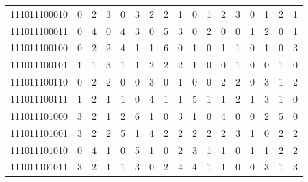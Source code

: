 \documentclass[10pt,a4paper]{article}
\begin{document}
\begin{longtable}{ |c|c|c|c|c|c|c|c|c|c|c|c|c|c|c|c|c| }
    111011100010              & 0                            & 2                                & 3                            & 0                              & 3   & 2   & 2   & 1   & 0   & 1   & 2   & 3   & 0   & 1   & 2   & 1   \\
    111011100011              & 0                            & 4                                & 0                            & 4                              & 3   & 0   & 5   & 3   & 0   & 2   & 0   & 0   & 1   & 2   & 0   & 1   \\
    111011100100              & 0                            & 2                                & 2                            & 4                              & 1   & 1   & 6   & 0   & 1   & 0   & 1   & 1   & 0   & 1   & 0   & 3   \\
    111011100101              & 1                            & 1                                & 3                            & 1                              & 1   & 2   & 2   & 2   & 1   & 0   & 0   & 1   & 0   & 0   & 1   & 0   \\
    111011100110              & 0                            & 2                                & 2                            & 0                              & 0   & 3   & 0   & 1   & 0   & 0   & 2   & 2   & 0   & 3   & 1   & 2   \\
    111011100111              & 1                            & 2                                & 1                            & 1                              & 0   & 4   & 1   & 1   & 5   & 1   & 1   & 2   & 1   & 3   & 1   & 0   \\
    111011101000              & 3                            & 2                                & 1                            & 2                              & 6   & 1   & 0   & 3   & 1   & 0   & 4   & 0   & 0   & 2   & 5   & 0   \\
    111011101001              & 3                            & 2                                & 2                            & 5                              & 1   & 4   & 2   & 2   & 2   & 2   & 2   & 3   & 1   & 0   & 2   & 2   \\
    111011101010              & 0                            & 4                                & 1                            & 0                              & 5   & 1   & 0   & 2   & 3   & 1   & 1   & 0   & 1   & 1   & 2   & 2   \\
    111011101011              & 3                            & 2                                & 1                            & 1                              & 3   & 0   & 2   & 4   & 4   & 1   & 1   & 0   & 0   & 3   & 1   & 3   \\

\end{longtable}
\end{document}
